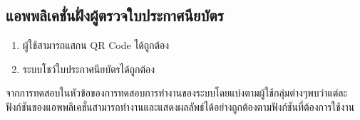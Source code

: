 \subsection{แอพพลิเคชั่นฝั่งผู้ตรวจใบประกาศนียบัตร}
\begin{enumerate}
    \item ผู้ใช้สามารถแสกน QR Code ได้ถูกต้อง
    \item ระบบโชว์ใบประกาศนียบัตรได้ถูกต้อง
\end{enumerate}
จากการทดสอบในหัวข้อของการทดสอบการทำงานของระบบโดยแบ่งตามผู้ใช้กลุ่มต่างๆพบว่าแต่ละฟังก์ชันของแอพพลิเคชั่นสามารถทำงานและแสดงผลลัพธ์ได้อย่างถูกต้องตามฟังก์ชันที่ต้องการใช้งาน
